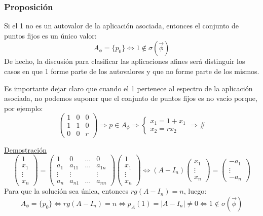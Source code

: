 \documentclass[10pt,a4paper,openright]{book}
\theoremstyle{break}
\begin{document}
\subsubsection*{Proposición}
Si el 1 no es un autovalor de la aplicación asociada, entonces el conjunto de puntos fijos es un único valor:
$$A_\phi = \{p_0\} \Leftrightarrow 1 \notin \sigma(\vec{\phi})$$
De hecho, la discusión para clasificar las aplicaciones afines será distinguir los casos en que 1 forme parte de los autovalores y que no forme parte de los mismos.

Es importante dejar claro que cuando el 1 pertenece al espectro de la aplicación asociada, no podemos suponer que el conjunto de puntos fijos es no vacío porque, por ejemplo:
$$\left(\begin{array}{c|cc}
1  & 0 & 0 \\
\hline
1 & 1 &  0 \\
0 & 0 &  r
\end{array}
\right) \Rightarrow p\in A_\phi \Rightarrow \begin{cases} x_1 =1 + x_1  \\ x_2 = rx_2 \end{cases} \Rightarrow \#$$

\underline{Demostración}
$$\begin{pmatrix}
1 \\ x_1 \\ \vdots \\ x_n
\end{pmatrix} = \left(\begin{array}{c|ccc}
1  & 0 & \ldots & 0 \\
\hline
a_1  & a_{11} & \ldots & a_{1n} \\
\vdots & \vdots &  & \vdots \\
a_n & a_{n1} & \ldots & a_{nn}
\end{array}
\right) \begin{pmatrix}
1 \\ x_1 \\ \vdots \\ x_n
\end{pmatrix} \Leftrightarrow (A - I_n) \begin{pmatrix}
x_1 \\ \vdots \\ x_n
\end{pmatrix} = \begin{pmatrix}
-a_1 \\ \vdots \\ -a_n
\end{pmatrix}$$
Para que la solución sea única, entonces $rg(A-I_n) = n$, luego:
$$A_\phi = \{p_0\} \Leftrightarrow rg(A - I_n) = n \Leftrightarrow p_A (1) = |A - I_n| \neq 0 \Leftrightarrow 1\notin \sigma(\vec{\phi})$$
\end{document}
